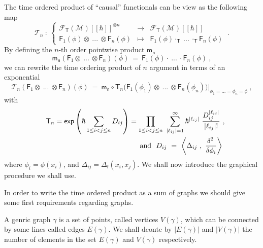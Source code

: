 \documentclass[11pt]{book}
\renewcommand{\exp}{\mathsf{exp}}
\newcommand{\abs}[1]{\left|#1\right|}
\newcommand{\sm}[1]{\left\langle#1\right\rangle}
\newcommand{\Fcal}{\mathcal{F}}
\newcommand{\Mcal}{\mathcal{M}}
\newcommand{\Tcal}{\mathcal{T}}
\newcommand{\Fsf}{\mathsf{F}}
\newcommand{\Tsf}{\mathsf{T}}
\newcommand{\fsf}{\mathsf{f}}
\newcommand{\msf}{\mathsf{m}}
\newcommand{\nsf}{\mathsf{n}}
\theoremstyle{break}
\begin{document}
The  time ordered product of ``causal'' functionals can be view as the following map
%
\begin{equation}
\Tcal_n \ : \ 
\left\{
\begin{array}{lcl}
\Fcal_\Tsf(\Mcal)[[\hbar]]^{\otimes n} & \to & \Fcal_\Tsf(\Mcal)[[\hbar]] \\
\Fsf_1(\phi) \otimes \ ... \ \otimes \Fsf_n(\phi) & \mapsto & \Fsf_1(\phi) \cdot_{\Tsf} \ ... \ \cdot_{\Tsf} \Fsf_n(\phi)
\end{array}
\right. \ .
\label{eq:time_ordered_op}
\end{equation}
% 
By defining the $n$-th order pointwise product $\msf_\nsf$
%
\begin{equation*}
\msf_\nsf \left( \Fsf_1 \otimes \ ... \ \otimes \Fsf_n \right)(\phi) \ = \ \Fsf_1(\phi) \cdot \ ... \ \cdot \Fsf_n(\phi) \ ,
\end{equation*}
%
we can rewrite the time ordering product of $n$ argument in terms of an exponential
%
\begin{equation*}
\Tcal_n (\Fsf_1 \otimes \ ... \ \otimes \Fsf_n)(\phi) \ = \ \msf_\nsf \circ \Tsf_n \bigg( \Fsf_1(\phi_1) \otimes \ ... \ \otimes \Fsf_n(\phi_n) \bigg) \bigg|_{\phi_1 = ... = \phi_n = \phi} \ ,
\end{equation*}
%
with 
%
\begin{eqnarray*}
&&\Tsf_n = \exp\left(\hbar \sum_{1 \leq i < j \leq n} D_{ij}\right) =
\prod_{1 \leq i < j \leq n} \ \sum_{\abs{\ell_{ij}}=1}^\infty \hbar^{\abs{\ell_{ij}}} \ \frac{D_{ij}^{\abs{\ell_{ij}}}}{\abs{\ell_{ij}} !} \ , \\
&& \mbox{ and } \ D_{ij} \ = \ \sm{\Delta_{ij} \ , \ \frac{\delta^2 \hfil}{\delta \phi_i} } \ 
\end{eqnarray*}
%
where $\phi_i = \phi(x_i)$, and $\Delta_{ij}=\Delta_\fsf(x_i,x_j)$. We shall now introduce the graphical procedure we shall use. 


\bigskip

In order to write the time ordered product as a sum of graphs we should give some first requirements regarding graphs.


A genric graph $\gamma$ is a set of points, called vertices $V(\gamma)$, which can be connected by some lines called edges $E(\gamma)$. We shall deonte by $\abs{E(\gamma)}$ and $\abs{V(\gamma)}$ the number of elements in the set $E(\gamma)$ and $V(\gamma)$ respectively. 
\end{document}

